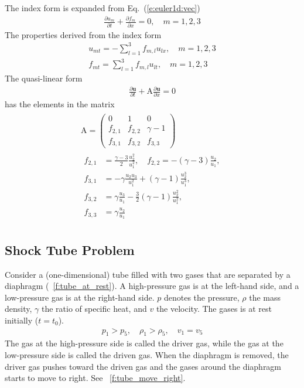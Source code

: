 \documentclass{turgon}
\begin{document}
The index form is expanded from Eq.~(\ref{e:euler1d:vec})
%
\begin{align}
  \frac{\partial u_m}{\partial t} + \frac{\partial f_m}{\partial x}
  = 0, \quad m = 1, 2, 3
  \label{e:euler1:idx}
\end{align}
%
The properties derived from the index form
%
\begin{gather}
  u_{mt} = -\sum_{l=1}^3 f_{m,l} u_{lx},  \quad m = 1, 2, 3
  \label{e:euler1:ut}
  \\
  f_{mt} = \sum_{l=1}^3 f_{m,l} u_{lt},  \quad m = 1, 2, 3
  \label{e:euler1:ft}
\end{gather}
%
The quasi-linear form
%
\begin{align}
  \frac{\partial\mathbf{u}}{\partial t}
  + \mathrm{A} \frac{\partial\mathbf{u}}{\partial x} = 0
  \label{e:euler1d:qlinear}
\end{align}
%
has the elements in the matrix
%
\begin{gather}
  \begin{gathered}
    \mathrm{A} = \left(
    \begin{array}{ccc}
      0       & 1       & 0          \\
      f_{2,1} & f_{2,2} & \gamma - 1 \\
      f_{3,1} & f_{3,2} & f_{3,3}
    \end{array}
    \right)
    \\
    \begin{aligned}
      f_{2,1} &= \frac{\gamma-3}{2}\frac{u_2^2}{u_1^2}, \quad
      f_{2,2} = -(\gamma-3)\frac{u_2}{u_1}, \\
      f_{3,1} &= -\gamma\frac{u_2 u_3}{u_1^2}
      + (\gamma-1)\frac{u_2^3}{u_1^3}, \\
      f_{3,2} &= \gamma\frac{u_3}{u_1}
      - \frac{3}{2}(\gamma-1)\frac{u_2^2}{u_1^2}, \\
      f_{3,3} &= \gamma\frac{u_2}{u_1}
    \end{aligned}
  \end{gathered}
  \label{e:euler1d:jaco}
\end{gather}

\subsection{Shock Tube Problem}

Consider a (one-dimensional) tube filled with two gases that are separated by a
diaphragm (\figurename~\ref{f:tube_at_rest}).
A high-pressure gas is at the left-hand side, and a low-pressure gas is at
the right-hand side.
$p$ denotes the pressure, $\rho$ the mass density, $\gamma$ the ratio of
specific heat, and $v$ the velocity.
The gases is at rest initially ($t = t_0$).
%
\begin{align}
  p_1 > p_5 , \quad
  \rho_1 > \rho_5, \quad
  v_1 = v_5
\end{align}
%
The gas at the high-pressure side is called the driver gas, while the gas at
the low-pressure side is called the driven gas.
When the diaphragm is removed, the driver gas pushes toward the driven gas
and the gases around the diaphragm starts to move to right.
See \figurename~\ref{f:tube_move_right}.
\end{document}
